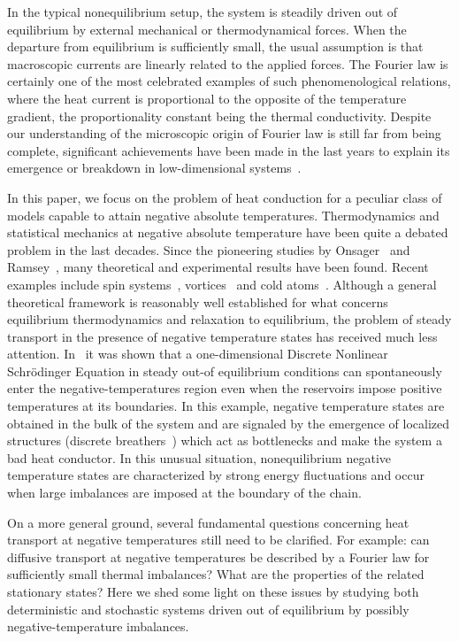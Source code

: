 \documentclass[iop, twocolumns, amssymb,notitlepage]{revtex4-1}
\begin{document}
In the typical nonequilibrium setup, the system is steadily driven out of equilibrium by external mechanical or
thermodynamical forces. When the departure 	 from equilibrium is sufficiently small,
the usual assumption is that  macroscopic currents are linearly related to the applied forces.
 The Fourier law is certainly one of the most celebrated examples of such phenomenological relations, where the heat current is proportional to the opposite of the temperature gradient, the proportionality constant being the 
thermal conductivity. 
Despite our understanding of the microscopic origin of  Fourier law  is still far from being complete, 
significant achievements have been made in the last years to explain its emergence or breakdown
in low-dimensional systems~\cite{lepri16}. 

In this paper, we  focus on the problem of heat conduction for a peculiar class of models capable to
attain negative absolute temperatures. Thermodynamics and statistical mechanics at negative absolute temperature have been quite a debated problem in the last decades. Since the pioneering studies by Onsager~\cite{onsager49}
and Ramsey~\cite{ramsey56}, many theoretical and experimental results have been found. Recent examples include
spin systems~\cite{oja97}, vortices~\cite{yatsuyanagi05,pakter18} and cold atoms~\cite{braun13}.
%
Although a general theoretical framework is reasonably well established for what concerns
equilibrium thermodynamics and relaxation to equilibrium, the problem of steady transport
in the presence of negative temperature states has received much less attention.
In~\cite{iubini17entropy} it was shown that a one-dimensional Discrete Nonlinear Schr\"odinger Equation in
steady out-of equilibrium conditions can spontaneously enter the negative-temperatures region
even when the reservoirs impose positive temperatures at its boundaries. In this example, negative temperature states
are obtained in the bulk of the system and are signaled by
 the emergence of localized structures (discrete breathers~\cite{flach08})  which act as bottlenecks and make the system a bad heat conductor.  
 In this unusual situation, nonequilibrium negative temperature states are characterized by strong energy fluctuations and
 occur when large imbalances are imposed at the boundary of the chain.
 
 On a more general ground,  several fundamental
questions concerning heat transport at negative temperatures still need to be clarified.
For example: can diffusive transport at negative temperatures be described by a Fourier law for sufficiently
small thermal imbalances? What are the properties of the related stationary states?
Here we  shed some light on these issues   by studying both deterministic and stochastic systems driven out of equilibrium by possibly negative-temperature imbalances. 
 
\end{document}
